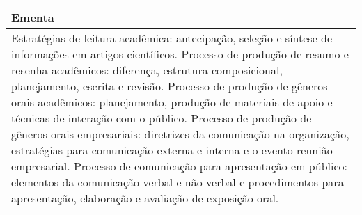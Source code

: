 \begin{quadro}[ht!]
\begin{tabular}{|p{3cm} p{2cm} p{3cm} p{2cm} p{3cm} p{2cm}|}
\multicolumn{6}{|p{15cm}|}{\cellcolor{blue1} Ementa} \\\hline
\hline\multicolumn{6}{|p{15cm}|}{\scriptsize Estratégias de leitura acadêmica: antecipação, seleção e síntese de informações em artigos científicos. Processo de produção de resumo e resenha acadêmicos: diferença, estrutura composicional, planejamento, escrita e revisão. Processo de produção de gêneros orais acadêmicos: planejamento, produção de materiais de apoio e técnicas de interação com o público. Processo de produção de gêneros orais empresariais: diretrizes da comunicação na organização, estratégias para comunicação externa e interna e o evento reunião empresarial. Processo de comunicação para apresentação em público: elementos da comunicação verbal e não verbal e procedimentos para apresentação, elaboração e avaliação de exposição oral.}\\\hline
\hline
	\end{tabular}
\end{quadro}
